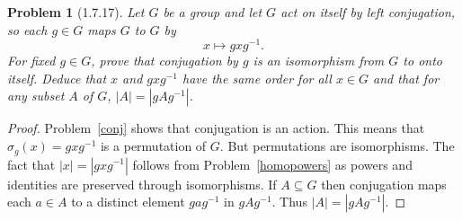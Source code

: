 \documentclass{article}
\newtheorem{problem}{Problem}
\begin{document}
\begin{problem}[1.7.17]
Let $G$ be a group and let $G$ act on itself by left conjugation, so each $g \in G$ maps $G$ to $G$ by
\[
x \mapsto gxg^{-1}.
\]
For fixed $g \in G$, prove that conjugation by $g$ is an isomorphism from $G$ to onto itself. Deduce that $x$ and $gxg^{-1}$ have the same order for all $x \in G$ and that for any subset $A$ of $G$, $|A| = |gAg^{-1}|$.
\end{problem}
\begin{proof}
Problem~\ref{conj} shows that conjugation is an action. This means that $\sigma_g (x) = gxg^{-1}$ is a permutation of $G$. But permutations are isomorphisms. The fact that $|x| = |gxg^{-1}|$ follows from Problem~\ref{homopowers} as powers and identities are preserved through isomorphisms. If $A \subseteq G$ then conjugation maps each $a \in A$ to a distinct element $gag^{-1}$ in $gAg^{-1}$. Thus $|A| = |gAg^{-1}|$.
\end{proof}
\end{document}
